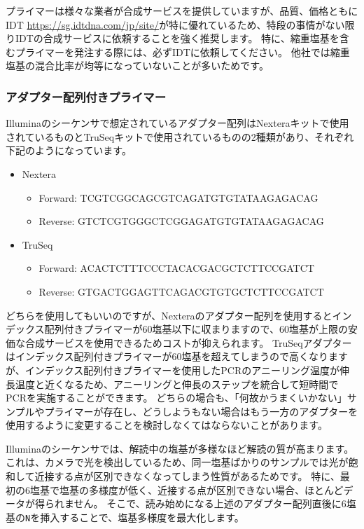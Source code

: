\documentclass[titlepage,10pt,a4paper]{jsbook}
\begin{document}
プライマーは様々な業者が合成サービスを提供していますが、品質、価格ともにIDT \url{https://sg.idtdna.com/jp/site/}が特に優れているため、特段の事情がない限りIDTの合成サービスに依頼することを強く推奨します。
特に、縮重塩基を含むプライマーを発注する際には、必ずIDTに依頼してください。
他社では縮重塩基の混合比率が均等になっていないことが多いためです。

\subsubsection{アダプター配列付きプライマー}

Illuminaのシーケンサで想定されているアダプター配列はNexteraキットで使用されているものとTruSeqキットで使用されているものの2種類があり、それぞれ下記のようになっています。

\begin{itemize}
\item Nextera
\begin{itemize}
\item Forward: TCGTCGGCAGCGTCAGATGTGTATAAGAGACAG
\item Reverse: GTCTCGTGGGCTCGGAGATGTGTATAAGAGACAG
\end{itemize}
\item TruSeq
\begin{itemize}
\item Forward: ACACTCTTTCCCTACACGACGCTCTTCCGATCT
\item Reverse: GTGACTGGAGTTCAGACGTGTGCTCTTCCGATCT
\end{itemize}
\end{itemize}

どちらを使用してもいいのですが、Nexteraのアダプター配列を使用するとインデックス配列付きプライマーが60塩基以下に収まりますので、60塩基が上限の安価な合成サービスを使用できるためコストが抑えられます。
TruSeqアダプターはインデックス配列付きプライマーが60塩基を超えてしまうので高くなりますが、インデックス配列付きプライマーを使用したPCRのアニーリング温度が伸長温度と近くなるため、アニーリングと伸長のステップを統合して短時間でPCRを実施することができます。
どちらの場合も、「何故かうまくいかない」サンプルやプライマーが存在し、どうしようもない場合はもう一方のアダプターを使用するように変更することを検討しなくてはならないことがあります。

Illuminaのシーケンサでは、解読中の塩基が多様なほど解読の質が高まります。
これは、カメラで光を検出しているため、同一塩基ばかりのサンプルでは光が飽和して近接する点が区別できなくなってしまう性質があるためです。
特に、最初の6塩基で塩基の多様度が低く、近接する点が区別できない場合、ほとんどデータが得られません。
そこで、読み始めになる上述のアダプター配列直後に6塩基の\texttt{N}を挿入することで、塩基多様度を最大化します。
\end{document}
